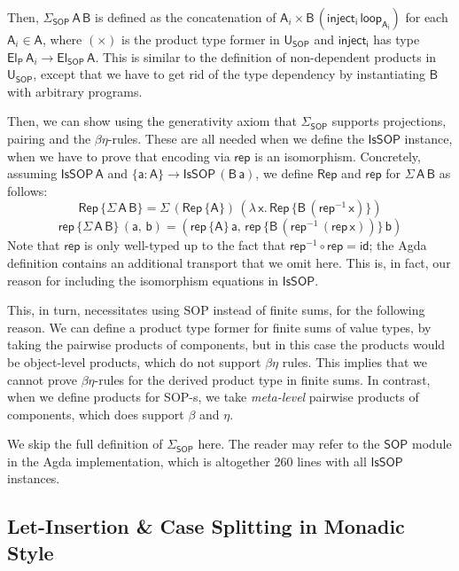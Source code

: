 \documentclass[acmsmall,screen]{acmart}
\newcommand{\mit}[1]{{\mathsf{#1}}}
\newcommand{\msf}[1]{{\mathsf{#1}}}
\newcommand{\lam}{\lambda\,}
\newcommand{\vA}{\mathsf{A}}
\newcommand{\vB}{\mathsf{B}}
\newcommand{\va}{\mathsf{a}}
\newcommand{\vb}{\mathsf{b}}
\newcommand{\vx}{\mathsf{x}}
\newcommand{\SOP}{\msf{SOP}}
\newcommand{\El}{\msf{El}}
\newcommand{\USOP}{\msf{U}_{\msf{SOP}}}
\newcommand{\Elprod}{\msf{El_{P}}}
\newcommand{\IsSOP}{\msf{IsSOP}}
\newcommand{\rep}{\msf{rep}}
\theoremstyle{remark}
\newcommand{\id}{\mit{id}}
\newcommand{\Rep}{\mit{Rep}}
\begin{document}
Then, $\Sigma_\SOP\,\vA\,\vB$ is defined as the concatenation of $\vA_i \times
\vB\,(\msf{inject_i}\,\msf{loop_{\vA_i}})$ for each $\vA_i \in \vA$, where
$({\times})$ is the product type former in $\USOP$ and $\msf{inject_i}$
has type $\Elprod\,\vA_i \to \El_\SOP\,\vA$. This is similar to the definition of
non-dependent products in $\USOP$, except that we have to get rid of the type
dependency by instantiating $\vB$ with arbitrary programs.

Then, we can show using the generativity axiom that $\Sigma_\SOP$ supports
projections, pairing and the $\beta\eta$-rules. These are all needed when we
define the $\IsSOP$ instance, when we have to prove that encoding via $\rep$
is an isomorphism. Concretely, assuming $\IsSOP\,\vA$ and $\{\va : \vA\} \to
\IsSOP\,(\vB\,\va)$, we define $\Rep$ and $\msf{rep}$ for $\Sigma\,\vA\,\vB$ as follows:
\[ \Rep\,\{\Sigma\,\vA\,\vB\} = \Sigma\,(\Rep\,\{\vA\})\,(\lam \vx.\,\Rep\,\{\vB\,(\rep^{-1}\,\vx)\}) \]
\[  \rep\,\{\Sigma\,\vA\,\vB\}\,(\va,\,\vb) = (\rep\,\{\vA\}\,\va,\,\rep\,\{\vB\,(\rep^{-1}\,(\rep\,\vx))\}\,\vb) \]
Note that $\rep$ is only well-typed up to the fact that $\rep^{-1} \circ \rep =
\id$; the Agda definition contains an additional transport that we omit here.
This is, in fact, our reason for including the isomorphism equations in
$\IsSOP$.

This, in turn, necessitates using SOP instead of finite sums, for the following
reason. We can define a product type former for finite sums of value types, by
taking the pairwise products of components, but in this case the products would
be object-level products, which do not support $\beta\eta$ rules. This implies
that we cannot prove $\beta\eta$-rules for the derived product type in finite
sums. In contrast, when we define products for SOP-s, we take \emph{meta-level}
pairwise products of components, which does support $\beta$ and $\eta$.

We skip the full definition of $\Sigma_\SOP$ here. The reader may refer to the
$\SOP$ module in the Agda implementation, which is altogether 260 lines with all
$\IsSOP$ instances.

\subsection{Let-Insertion \& Case Splitting in Monadic Style}
\end{document}
